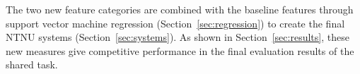 The two new feature categories are combined with the baseline features
through support vector machine regression (Section~\ref{sec:regression})
to create the final NTNU systems (Section~\ref{sec:systems}).
As shown in Section~\ref{sec:results}, these new measures give competitive performance 
in the final evaluation results of the shared task.

